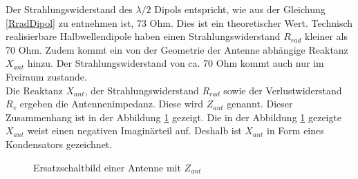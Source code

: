 Der Strahlungswiderstand des $\lambda/2$ Dipols entspricht, wie aus der Gleichung \ref{RradDipol} zu entnehmen ist, 73 Ohm. Dies ist ein theoretischer Wert. Technisch realisierbare Halbwellendipole haben einen Strahlungswiderstand $R_{rad}$ kleiner als 70 Ohm. Zudem kommt  ein von der  Geometrie der Antenne abhängige Reaktanz $X_{ant}$ hinzu. Der Strahlungswiderstand von ca. 70 Ohm kommt auch nur im Freiraum zustande.\\
Die Reaktanz $X_{ant}$,  der Strahlungswiderstand $R_{rad}$ sowie der Verlustwiderstand $R_v$ ergeben die Antennenimpedanz. Diese wird $Z_{ant}$  genannt. Dieser Zusammenhang ist  in der Abbildung \ref{fig:ESBantenneZant} gezeigt. Die in der Abbildung \ref{fig:ESBantenneZant} gezeigte $X_{ant}$ weist einen negativen Imaginärteil auf. Deshalb ist $X_{ant}$ in Form eines Kondensators gezeichnet.

\begin{figure}[!ht]%
	\begin{center}
	\end{center}
\caption{Ersatzschaltbild einer Antenne mit $Z_{ant}$}
\label{fig:ESBantenneZant}
\end{figure}



